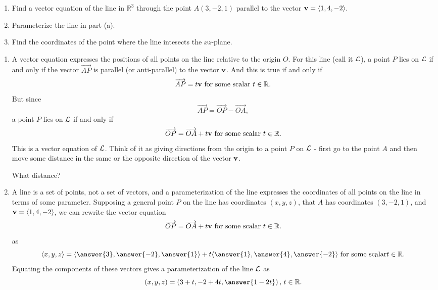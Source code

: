 \documentclass{ximera}
\begin{document}
\begin{example} \label{Ex3434523093}
\begin{enumerate}
\item Find a vector equation of the line in $\mathbb{R}^3$ through the point $A(3,-2,1)$ parallel to the vector ${\bf v}  =\langle 1,4,-2\rangle$.

\item Parameterize the line in part (a).

\item Find the coordinates of the point where the line intesects the $xz$-plane.

\end{enumerate}

\begin{explanation}
\begin{enumerate}
\item A vector equation expresses the positions of all points on the line relative to the origin $O$. For this line (call it ${\cal L}$), a point $P$ lies on ${\cal L}$ if and only if the vector $\overrightarrow{AP}$ is parallel (or anti-parallel) to the vector ${\bf v}$. And this is true if and only if
\[
       \overrightarrow{AP} = t {\bf v} \text{ for some scalar } t\in \mathbb{R} .
\]
But since
\[
    \overrightarrow{AP} = \overrightarrow{OP} - \overrightarrow{OA} ,
\]
a point $P$ lies on ${\cal L}$ if and only if
\[
    \overrightarrow{OP} = \overrightarrow{OA} + t {\bf v} \text{ for some scalar } t\in \mathbb{R}.
\]
This is a vector equation of ${\cal L}$. Think of it as giving directions from the origin to a point $P$ on ${\cal L}$ - first go to the point $A$ and then move some distance in the same or the opposite direction of the vector ${\bf v}$.

What distance?
\begin{multipleChoice}
\end{multipleChoice}

\item A line is a set of points, not a set of vectors, and a parameterization of the line expresses the coordinates of all points on the line in terms of some parameter. Supposing a general point $P$ on the line has coordinates $(x,y,z)$, that $A$ has coordinates $(3,-2,1)$, and ${\bf v} = \langle 1,4,-2\rangle$, we can rewrite the vector equation
\[
    \overrightarrow{OP} = \overrightarrow{OA} + t {\bf v} \text{ for some scalar } t\in \mathbb{R}.
\]
as
\[
    \langle x, y, z \rangle = \langle \answer{3}, \answer{-2}, \answer{1} \rangle + t \langle \answer{1}, \answer{4}, \answer{-2} \rangle \text{ for some scalar} t\in \mathbb{R}.
\]
Equating the components of these vectors gives a parameterization of the line ${\cal L}$ as 
\[
   (x,y,z) = (3+t , -2 + 4t, \answer{1-2t}) \, , \, t\in \mathbb{R} .
\]


\end{enumerate}
\end{explanation}
\end{example}
\end{document}
